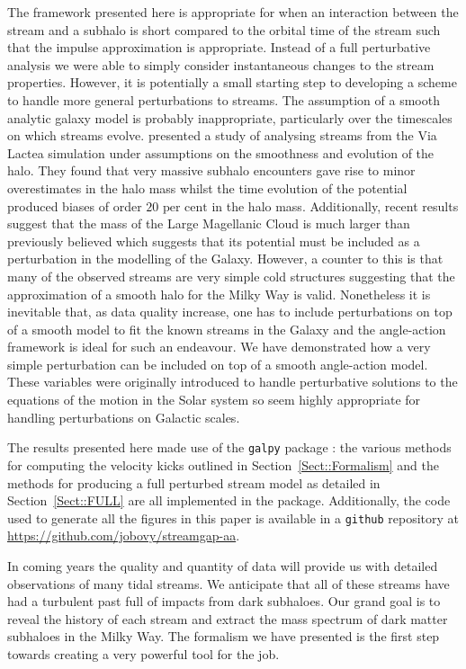 \documentclass[useAMS,usenatbib,fleqn,a4paper]{mn2e}
\def\percent{\text{ per cent}}
\def\percent{\text{ per cent}}
\begin{document}
The framework presented here is appropriate for when an interaction between the stream and a subhalo is short compared to the orbital time of the stream such that the impulse approximation is appropriate. Instead of a full perturbative analysis we were able to simply consider instantaneous changes to the stream properties. However, it is potentially a small starting step to developing a scheme to handle more general perturbations to streams. The assumption of a smooth analytic galaxy model is probably inappropriate, particularly over the timescales on which streams evolve. \cite{Bonaca2014} presented a study of analysing streams from the Via Lactea simulation under assumptions on the smoothness and evolution of the halo. They found that very massive subhalo encounters gave rise to minor overestimates in the halo mass whilst the time evolution of the potential produced biases of order $20\percent$ in the halo mass. Additionally, recent results suggest that the mass of the Large Magellanic Cloud is much larger than previously believed \citep{Kallivayalil2013, Penarrubia2016} which suggests that its potential must be included as a perturbation in the modelling of the Galaxy. However, a counter to this is that many of the observed streams are very simple cold structures suggesting that the approximation of a smooth halo for the Milky Way is valid. Nonetheless it is inevitable that, as data quality increase, one has to include perturbations on top of a smooth model to fit the known streams in the Galaxy and the angle-action framework is ideal for such an endeavour. We have demonstrated how a very simple perturbation can be included on top of a smooth angle-action model. These variables were originally introduced to handle perturbative solutions to the equations of the motion in the Solar system so seem highly appropriate for handling perturbations on Galactic scales.

The results presented here made use of the \texttt{galpy} package \citep{galpy}: the various methods for computing the velocity kicks outlined in Section~\ref{Sect::Formalism} and the methods for producing a full perturbed stream model as detailed in Section~\ref{Sect::FULL} are all implemented in the package. Additionally, the code used to generate all the figures in this paper is available in a \texttt{github} repository at \href{https://github.com/jobovy/streamgap-aa}{https://github.com/jobovy/streamgap-aa}.

In coming years the quality and quantity of data will provide us with detailed observations of many tidal streams. We anticipate that all of these streams have had a turbulent past full of impacts from dark subhaloes. Our grand goal is to reveal the history of each stream and extract the mass spectrum of dark matter subhaloes in the Milky Way. The formalism we have presented is the first step towards creating a very powerful tool for the job.
\end{document}
